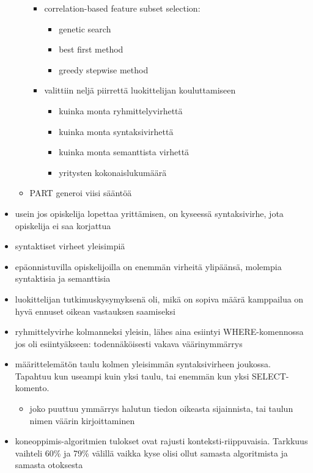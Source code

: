 \begin{itemize}
\begin{itemize}
        \begin{itemize}
            \item correlation-based feature subset selection:
            \begin{itemize}
                \item genetic search
                \item best first method
                \item greedy stepwise method
            \end{itemize}
            \item valittiin neljä piirrettä luokittelijan kouluttamiseen
            \begin{itemize}
                \item kuinka monta ryhmittelyvirhettä
                \item kuinka monta syntaksivirhettä
                \item kuinka monta semanttista virhettä
                \item yritysten kokonaislukumäärä
            \end{itemize}
        \end{itemize}
        \item PART generoi viisi sääntöä
    \end{itemize}
    \item usein jos opiskelija lopettaa yrittämisen, on kyseessä syntaksivirhe, jota opiskelija ei saa korjattua
    \item syntaktiset virheet yleisimpiä
    \item epäonnistuvilla opiskelijoilla on enemmän virheitä ylipäänsä, molempia syntaktisia ja semanttisia
    \item luokittelijan tutkimuskysymyksenä oli, mikä on sopiva määrä kamppailua on hyvä ennuset oikean vastauksen saamiseksi
    \item ryhmittelyvirhe kolmanneksi yleisin, lähes aina esiintyi WHERE-komennossa jos oli esiintyäkseen: todennäköisesti vakava väärinymmärrys
    \item määrittelemätön taulu kolmen yleisimmän syntaksivirheen joukossa. Tapahtuu kun useampi kuin yksi taulu, tai enemmän kun yksi SELECT-komento. 
    \begin{itemize}
        \item joko puuttuu ymmärrys halutun tiedon oikeasta sijainnista, tai taulun nimen väärin kirjoittaminen
    \end{itemize}
    \item koneoppimis-algoritmien tulokset ovat rajusti konteksti-riippuvaisia. Tarkkuus vaihteli 60\% ja 79\% välillä vaikka kyse olisi ollut samasta algoritmista ja samasta otoksesta
\end{itemize}

